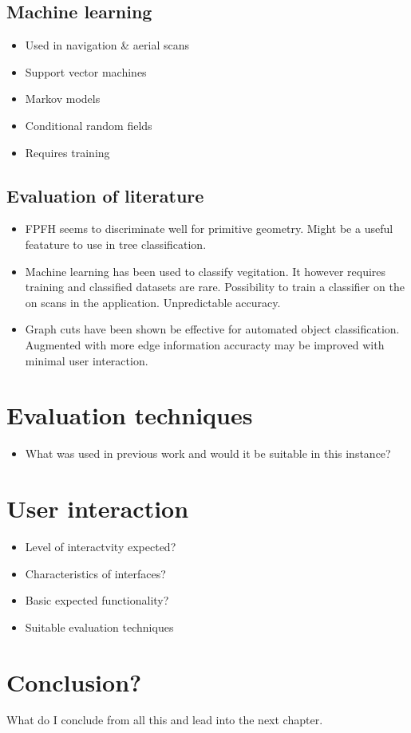 	\subsection{Machine learning}
		\begin{itemize}
		\item Used in navigation \& aerial scans
		\item Support vector machines
		\item Markov models
		\item Conditional random fields
		\item Requires training
		\end{itemize}
		
	\subsection{Evaluation of literature}
		\begin{itemize}
		\item FPFH seems to discriminate well for primitive geometry. Might be a useful featature to use in tree classification.
		\item Machine learning has been used to classify vegitation. It however requires training and classified datasets are rare. Possibility to train a classifier on the on scans in the application. Unpredictable accuracy.
		\item Graph cuts have been shown be effective for automated object classification. Augmented with more edge information accuracty may be improved with minimal user interaction.
		\end{itemize}

\section{Evaluation techniques}
\begin{itemize}
	\item What was used in previous work and would it be suitable in this instance?
\end{itemize}
	
\section{User interaction}
	\begin{itemize}
		\item Level of interactvity expected?
		\item Characteristics of interfaces?
		\item Basic expected functionality?
		\item Suitable evaluation techniques
	\end{itemize}
		

\section{Conclusion?}
What do I conclude from all this and lead into the next chapter.		

